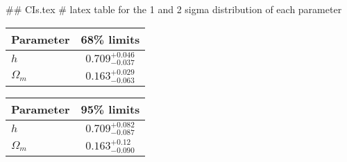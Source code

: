 ## CIs.tex
# latex table for the 1 and 2 sigma distribution of each parameter

\begin{tabular} { l  c}
 Parameter &  68\% limits\\
\hline
{\boldmath$h              $} & $0.709^{+0.046}_{-0.037}   $\\
{\boldmath$\Omega_m       $} & $0.163^{+0.029}_{-0.063}   $\\
\hline
\end{tabular}

\begin{tabular} { l  c}
 Parameter &  95\% limits\\
\hline
{\boldmath$h              $} & $0.709^{+0.082}_{-0.087}   $\\
{\boldmath$\Omega_m       $} & $0.163^{+0.12}_{-0.090}    $\\
\hline
\end{tabular}
